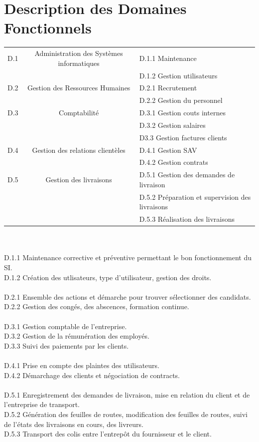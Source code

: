 \documentclass{report}
\begin{document}
\section{Description des Domaines Fonctionnels}

\begin{tabular}{|c|c|l|}
\hline
D.1 & Administration des Systèmes informatiques& D.1.1 Maintenance\\
&&																							 D.1.2 Gestion utilisateurs\\
\hline
D.2 & Gestion des Ressources Humaines & D.2.1 Recrutement\\
&&																			D.2.2 Gestion du personnel\\
\hline
D.3 & Comptabilité & D.3.1 Gestion couts internes\\
&&									 D.3.2 Gestion salaires\\
&&									D3.3 Gestion factures clients\\
\hline
D.4 & Gestion des relations clientèles & D.4.1 Gestion SAV\\
&&																			D.4.2 Gestion contrats\\
\hline
D.5 &  Gestion des livraisons & D.5.1 Gestion des demandes de livraison\\
&&															D.5.2 Préparation et supervision des livraisons\\
&&															D.5.3 Réalisation des livraisons\\
\hline
\end{tabular}
~~\\
~~\\
D.1.1 Maintenance corrective et préventive permettant le bon fonctionnement du SI.\\
D.1.2 Création des utlisateurs, type d’utilisateur, gestion des droits.\\
~~\\
D.2.1 Ensemble des actions et démarche pour trouver sélectionner des candidats.\\
D.2.2 Gestion des congés, des abscences, formation continue.\\
~~\\
D.3.1 Gestion comptable de l’entreprise.\\
D.3.2 Gestion de la rémunération des employés.\\
D.3.3 Suivi des paiements par les clients.\\
~~\\
D.4.1 Prise en compte des plaintes des utilisateurs.\\
D.4.2 Démarchage des clients et négociation de contracts.\\
~~\\
D.5.1  Enregistrement des demandes de livraison, mise en relation du client et de l’entreprise de transport.\\
D.5.2 Génération des feuilles de routes, modification des feuilles de routes, suivi de l’états des livraisons en cours, des livreurs.\\
D.5.3 Transport des colis entre l'entrepôt du fournisseur et le client.\\
\end{document}
